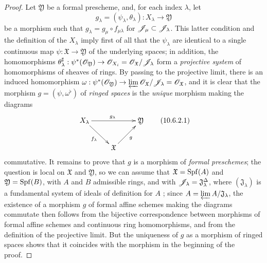 \begin{proof}
\label{proof-1.10.6.2}
Let $\mathfrak{Y}$ be a formal prescheme, and, for each index $\lambda$, let
\[
  g_\lambda=(\psi_\lambda,\theta_\lambda):X_\lambda\to\mathfrak{Y}
\]
be a morphism such that $g_\lambda=g_\mu\circ f_{\mu\lambda}$ for $\mathscr{J}_\mu\subset\mathscr{J}_\lambda$.
This latter condition and the definition of the $X_\lambda$ imply first of all that the $\psi_\lambda$ are identical to a single continuous map $\psi:\mathfrak{X}\to\mathfrak{Y}$ of the underlying spaces; in addition, the homomorphisms $\theta_\lambda^\sharp:\psi^*(\sh{O}_\mathfrak{Y})\to\sh{O}_{X_i}=\sh{O}_\mathfrak{X}/\sh{J}_\lambda$ form a \emph{projective system} of homomorphisms of sheaves of rings.
By passing to the projective limit, there is an induced homomorphism $\omega:\psi^*(\sh{O}_\mathfrak{Y})\to\varprojlim\sh{O}_\mathfrak{X}/\sh{J}_\lambda=\sh{O}_\mathfrak{X}$, and it is clear that the morphism $g=(\psi,\omega^\flat)$ of \emph{ringed spaces} is the \emph{unique} morphism making the diagrams
\[
\label{1.10.6.2.1}
  \xymatrix{
    X_\lambda\ar[rr]^{g_\lambda}\ar[rd]_{f_\lambda} & &
    \mathfrak{Y}\\
    & \mathfrak{X}\ar[ru]_g
  }
  \tag{10.6.2.1}
\]
commutative.
It remains to prove that $g$ is a morphism of \emph{formal preschemes}; the question is local on $\mathfrak{X}$ and $\mathfrak{Y}$, so we can assume that $\mathfrak{X}=\operatorname{Spf}(A)$ and $\mathfrak{Y}=\operatorname{Spf}(B)$, with $A$ and $B$ admissible rings, and with $\mathscr{J}_\lambda=\mathfrak{J}_\lambda^\Delta$, where $(\mathfrak{J}_\lambda)$ is a fundamental system of ideals of definition for $A$ ; since $A=\varprojlim A/\mathfrak{J}_\lambda$, the existence of a morphism $g$ of formal affine schemes making the diagrams  commutate then follows from the bijective correspondence  between morphisms of formal affine schemes and continuous ring homomorphisms, and from the definition of the projective limit.
But the uniqueness of $g$ as a morphism of ringed spaces shows that it coincides with the morphism in the beginning of the proof.
\end{proof}

